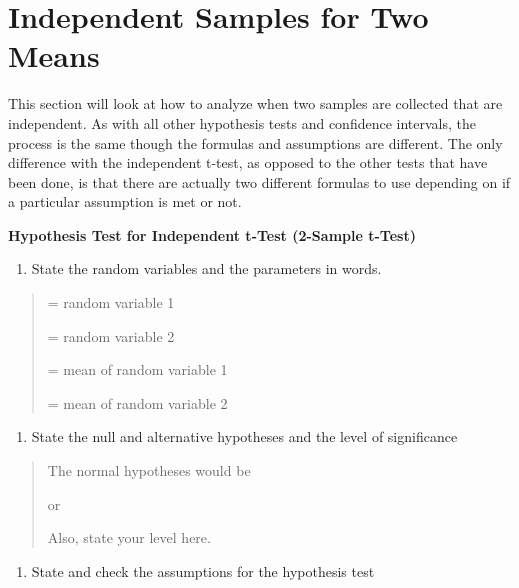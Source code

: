 \documentclass[]{book}
\providecommand{\tightlist}{%
  \setlength{\itemsep}{0pt}\setlength{\parskip}{0pt}}
\begin{document}
\hypertarget{independent-samples-for-two-means}{%
\section{Independent Samples for Two Means}\label{independent-samples-for-two-means}}

This section will look at how to analyze when two samples are collected that are independent. As with all other hypothesis tests and confidence intervals, the process is the same though the formulas and assumptions are different. The only difference with the independent t-test, as opposed to the other tests that have been done, is that there are actually two different formulas to use depending on if a particular assumption is met or not.

\textbf{Hypothesis Test for Independent t-Test (2-Sample t-Test)}

\begin{enumerate}
\def\labelenumi{\arabic{enumi}.}
\tightlist
\item
  State the random variables and the parameters in words.
\end{enumerate}

\begin{quote}
= random variable 1

= random variable 2

= mean of random variable 1

= mean of random variable 2
\end{quote}

\begin{enumerate}
\def\labelenumi{\arabic{enumi}.}
\setcounter{enumi}{1}
\tightlist
\item
  State the null and alternative hypotheses and the level of significance
\end{enumerate}

\begin{quote}
The normal hypotheses would be

or

Also, state your level here.
\end{quote}

\begin{enumerate}
\def\labelenumi{\arabic{enumi}.}
\setcounter{enumi}{2}
\tightlist
\item
  State and check the assumptions for the hypothesis test
\end{enumerate}
\end{document}
